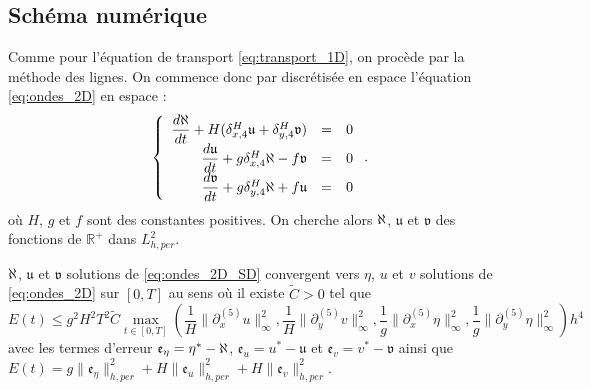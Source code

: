 \subsection{Schéma numérique}

Comme pour l'équation de transport \eqref{eq:transport_1D}, on procède par la méthode des lignes. On commence donc par discrétisée en espace l'équation \eqref{eq:ondes_2D} en espace :
\begin{equation}
\left\lbrace
\begin{array}{rcl}
\dfrac{d \aleph}{dt} + H ( \delta_{x,4}^H \mathfrak{u} + \delta_{y,4}^H \mathfrak{v} ) & = & 0 \\
\dfrac{d \mathfrak{u}}{dt} + g \delta_{x,4}^H \aleph - f \mathfrak{v} & = & 0 \\
\dfrac{d \mathfrak{v}}{dt} + g \delta_{y,4}^H \aleph + f \mathfrak{u} & = & 0 \\
\end{array}
\right. .
\label{eq:ondes_2D_SD}
\end{equation}
où $H$, $g$ et $f$ sont des constantes positives.
On cherche alors $\aleph$, $\mathfrak{u}$ et $\mathfrak{v}$ des fonctions de $\mathbb{R}^+$ dans $L^2_{h,per}$.

\begin{proposition}
$\aleph$, $\mathfrak{u}$ et $\mathfrak{v}$ solutions de \eqref{eq:ondes_2D_SD} convergent vers $\eta$, $u$ et $v$ solutions de \eqref{eq:ondes_2D} sur $[0,T]$ au sens où il existe $\tilde{C}>0$ tel que
\begin{equation}
E(t) \leq g^2 H^2 T^2 \tilde{C} \max_{t \in [0,T]} \left( \dfrac{1}{H} \| \partial_x^{(5)} u \|^2_{\infty}, \dfrac{1}{H} \| \partial_y^{(5)} v \|^2_{\infty}, \dfrac{1}{g} \| \partial_x^{(5)} \eta \|^2_{\infty}, \dfrac{1}{g} \| \partial_y^{(5)} \eta \|^2_{\infty}  \right) h^4
\end{equation}
avec les termes d'erreur $\mathfrak{e}_{\eta} = \eta^* - \aleph$, $\mathfrak{e}_{u} = u^* - \mathfrak{u}$ et $\mathfrak{e}_{v} = v^* - \mathfrak{v}$ ainsi que $E(t) = g \| \mathfrak{e}_{\eta} \|^2_{h,per} + H \| \mathfrak{e}_u \|^2_{h,per} + H \| \mathfrak{e}_v \|^2_{h,per}$.
\end{proposition}

